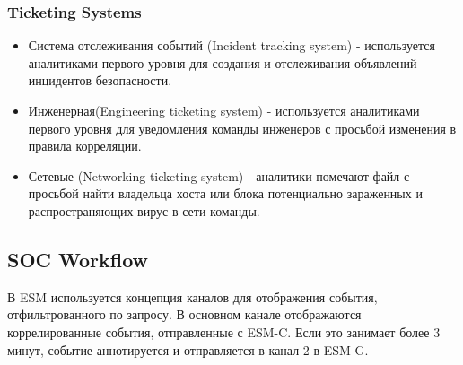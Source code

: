 \documentclass[12pt,]{article}
\begin{document}
\subsubsection{Ticketing Systems}
\begin{itemize}
\item Система отслеживания событий (Incident tracking system) - используется аналитиками первого уровня для создания и отслеживания объявлений инцидентов безопасности.
\item Инженерная(Engineering ticketing system) - используется аналитиками первого уровня для уведомления команды инженеров с просьбой изменения в правила корреляции.
\item Сетевые (Networking ticketing system) -  аналитики помечают файл  с просьбой найти владельца хоста или блока потенциально зараженных и распространяющих вирус в сети команды.
\end{itemize}
\subsection{SOC Workflow}
В ESM используется концепция каналов для отображения события, отфильтрованного по запросу. В основном канале отображаются коррелированные события, отправленные с ESM-C. Если это занимает более 3 минут, событие аннотируется и отправляется в канал 2 в ESM-G.
\end{document}
